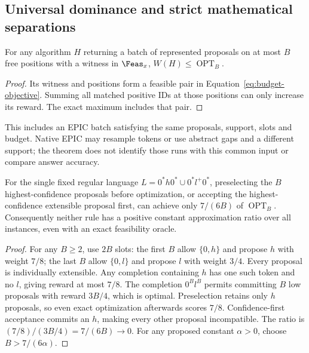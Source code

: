 \subsection{Universal dominance and strict mathematical separations}

\begin{theorem}
For any algorithm $H$ returning a batch of represented proposals on at most $B$ free positions with a witness in $\Feas_x$, $W(H)\leq\operatorname{OPT}_B$.
\label{thm:budget-dominance}
\end{theorem}
\begin{proof}
Its witness and positions form a feasible pair in Equation~\ref{eq:budget-objective}. Summing all matched positive IDs at those positions can only increase its reward. The exact maximum includes that pair.
\end{proof}

This includes an EPIC batch satisfying the same proposals, support, slots and budget. Native EPIC may resample tokens or use abstract gaps and a different support; the theorem does not identify those runs with this common input or compare answer accuracy.

\begin{theorem}
For the single fixed regular language $L=0^*h0^*\cup0^*l^+0^*$, preselecting the $B$ highest-confidence proposals before optimization, or accepting the highest-confidence extensible proposal first, can achieve only $7/(6B)$ of $\operatorname{OPT}_B$. Consequently neither rule has a positive constant approximation ratio over all instances, even with an exact feasibility oracle.
\label{thm:budget-confidence}
\end{theorem}
\begin{proof}
For any $B\geq2$, use $2B$ slots: the first $B$ allow $\{0,h\}$ and propose $h$ with weight $7/8$; the last $B$ allow $\{0,l\}$ and propose $l$ with weight $3/4$. Every proposal is individually extensible. Any completion containing $h$ has one such token and no $l$, giving reward at most $7/8$. The completion $0^Bl^B$ permits committing $B$ low proposals with reward $3B/4$, which is optimal. Preselection retains only $h$ proposals, so even exact optimization afterwards scores $7/8$. Confidence-first acceptance commits an $h$, making every other proposal incompatible. The ratio is $(7/8)/(3B/4)=7/(6B)\to0$. For any proposed constant $\alpha>0$, choose $B>7/(6\alpha)$.
\end{proof}

